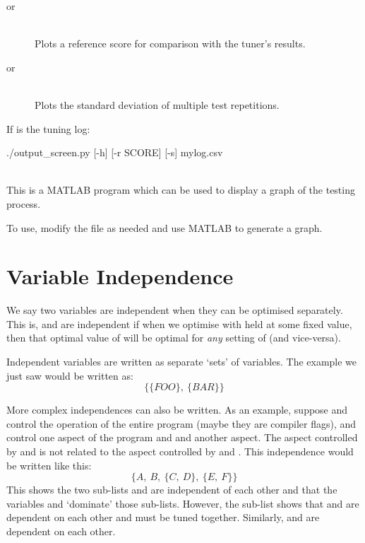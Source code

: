 \documentclass[a4paper, draft]{article}
\begin{document}
\begin{description}
\begin{description}
            \item[ \textnormal{or} ] \hfill\\
                Plots a reference score for comparison with the tuner's results.
            
            \item[ \textnormal{or} ] \hfill\\
                Plots the standard deviation of multiple test repetitions.
            
        \end{description}
        
        If  is the tuning log:
        \begin{Code}[numbers=none]
./output_screen.py [-h] [-r SCORE] [-s] mylog.csv
        \end{Code}


    \item[\filename{utilities/csv\_plot.m}] \hfill \\
        This is a MATLAB program which can be used to display a graph of the 
        testing process.
        
        To use, modify the file as needed and use MATLAB to generate a graph.


\end{description}





\clearpage

\section{Variable Independence}
\label{sec:var-indep}
We say two variables are independent when they can be optimised separately. 
This is,  and  are independent if when we optimise 
 with  held at some fixed value, then that optimal 
value of  will be optimal for \emph{any} setting of  
(and vice-versa). 

Independent variables are written as separate `sets' of 
variables. The example we just saw would be written as:
\[\{\{FOO\},~\{BAR\}\}\]

More complex independences can also be written. As an example, suppose 
 and  control the operation of the entire program (maybe 
they are compiler flags),  and  control one aspect of the 
program and  and  another aspect. The aspect controlled 
by  and  is not related to the aspect controlled by 
 and . This independence would be written like this: 
\[\{A,~B,~\{C,~D\},~\{E,~F\}\}\]
This shows the two sub-lists  and  are 
independent of each other and that the variables  and  
`dominate' those sub-lists. However, the sub-list  shows that 
 and  are dependent on each other and must be tuned together. 
Similarly,  and  are dependent on each other.
\end{document}
